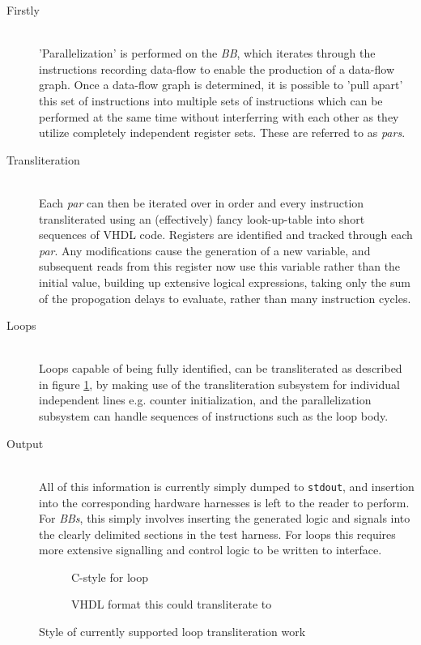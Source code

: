 \documentclass[a4paper]{article}
\begin{document}
\begin{description}
  \item[Firstly] \hfill\\
    'Parallelization' is performed on the \emph{BB}, which iterates through the instructions recording data-flow to enable the production of a data-flow graph.
    Once a data-flow graph is determined, it is possible to 'pull apart' this set of instructions into multiple sets of instructions which can be performed at the same time without interferring with each other as they utilize completely independent register sets. These are referred to as \emph{pars}.
  \item[Transliteration] \hfill\\
    Each \emph{par} can then be iterated over in order and every instruction transliterated using an (effectively) fancy look-up-table into short sequences of VHDL code. Registers are identified and tracked through each \emph{par}. Any modifications cause the generation of a new variable, and subsequent reads from this register now use this variable rather than the initial value, building up extensive logical expressions, taking only the sum of the propogation delays to evaluate, rather than many instruction cycles.
  \item[Loops] \hfill\\
    Loops capable of being fully identified, can be transliterated as described in figure \ref{fig:loop-method}, by making use of the transliteration subsystem for individual independent lines e.g. counter initialization, and the parallelization subsystem can handle sequences of instructions such as the loop body.
  \item[Output] \hfill\\
    All of this information is currently simply dumped to \texttt{stdout}, and insertion into the corresponding hardware harnesses is left to the reader to perform. For \emph{BBs}, this simply involves inserting the generated logic and signals into the clearly delimited sections in the test harness. For loops this requires more extensive signalling and control logic to be written to interface.
\end{description}

\begin{figure}[pb]
  \centering
  \begin{subfigure}[b]{\textwidth}
    
    \caption{C-style for loop}
  \end{subfigure}
  \begin{subfigure}[b]{\textwidth}
    
    \caption{VHDL format this could transliterate to}
  \end{subfigure}
  \caption{Style of currently supported loop transliteration work}
  \label{fig:loop-method}
\end{figure}
\end{document}
